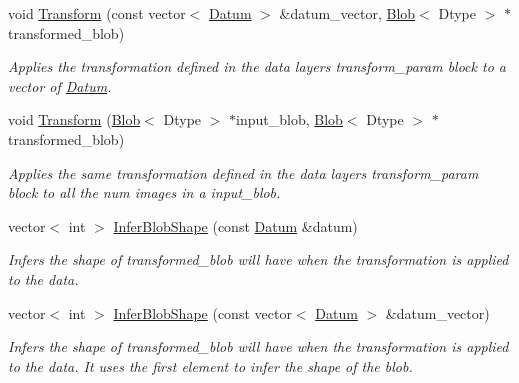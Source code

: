 \begin{DoxyCompactItemize}
void \mbox{\hyperlink{classcaffe_1_1_data_transformer_a082cad626c5f51c9f8d93bb88cca1bd0}{Transform}} (const vector$<$ \mbox{\hyperlink{classcaffe_1_1_datum}{Datum}} $>$ \&datum\+\_\+vector, \mbox{\hyperlink{classcaffe_1_1_blob}{Blob}}$<$ Dtype $>$ $\ast$transformed\+\_\+blob)
\begin{DoxyCompactList}\small\item\em Applies the transformation defined in the data layer\textquotesingle{}s transform\+\_\+param block to a vector of \mbox{\hyperlink{classcaffe_1_1_datum}{Datum}}. \end{DoxyCompactList}\item 
void \mbox{\hyperlink{classcaffe_1_1_data_transformer_a168abf1bf9466420da6968178c6edb4d}{Transform}} (\mbox{\hyperlink{classcaffe_1_1_blob}{Blob}}$<$ Dtype $>$ $\ast$input\+\_\+blob, \mbox{\hyperlink{classcaffe_1_1_blob}{Blob}}$<$ Dtype $>$ $\ast$transformed\+\_\+blob)
\begin{DoxyCompactList}\small\item\em Applies the same transformation defined in the data layer\textquotesingle{}s transform\+\_\+param block to all the num images in a input\+\_\+blob. \end{DoxyCompactList}\item 
vector$<$ int $>$ \mbox{\hyperlink{classcaffe_1_1_data_transformer_a4a8e7feba153c9c671d0aabc8f12e65b}{Infer\+Blob\+Shape}} (const \mbox{\hyperlink{classcaffe_1_1_datum}{Datum}} \&datum)
\begin{DoxyCompactList}\small\item\em Infers the shape of transformed\+\_\+blob will have when the transformation is applied to the data. \end{DoxyCompactList}\item 
vector$<$ int $>$ \mbox{\hyperlink{classcaffe_1_1_data_transformer_ad4e4f3c11822fbe2f37d2d7f82bcc36e}{Infer\+Blob\+Shape}} (const vector$<$ \mbox{\hyperlink{classcaffe_1_1_datum}{Datum}} $>$ \&datum\+\_\+vector)
\begin{DoxyCompactList}\small\item\em Infers the shape of transformed\+\_\+blob will have when the transformation is applied to the data. It uses the first element to infer the shape of the blob. \end{DoxyCompactList}\end{DoxyCompactItemize}
